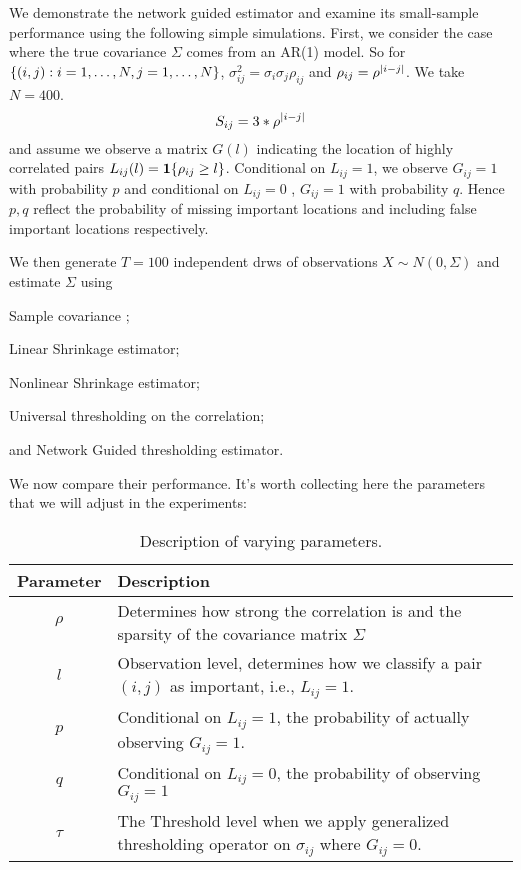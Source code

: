 We demonstrate the network guided estimator and examine its small-sample performance using the following simple simulations. First, we consider the case where the true covariance \(\Sigma\) comes from an AR(1) model. So for \(\Bqty{(i,j): i =1 ,\dots, N, j = 1,\dots,N} \), \(\sigma_{ij}^{2} = \sigma_{i}\sigma_{j} \rho_{ij}\) and \(\rho_{ij} = \rho^{\abs{i - j}}\). We take \(N = 400\). 
\begin{equation*}
     S_{ij} = 3 * \rho^{\abs{i - j}}
\end{equation*}
and assume we observe a matrix \(G(l)\) indicating the location of highly correlated pairs \(L_{ij}(l) = \mathbf{1}\Bqty{\rho_{ij} \geq l}\). Conditional on \(L_{ij} = 1\), we observe \(G_{ij}= 1\) with probability \(p\) and conditional on \(L_{ij}  =0\) , \(G_{ij}  =1\) with probability \(q\). Hence \(p,q\) reflect the probability of missing important locations and including false important locations respectively. 

We then generate \(T = 100\) independent drws of observations \(X \sim N(0, \Sigma)\) and estimate \(\Sigma\) using 
\begin{enumerate*}
     \item Sample covariance ;
     \item Linear Shrinkage estimator;
     \item Nonlinear Shrinkage estimator;
     \item Universal thresholding on the correlation;
     \item and Network Guided thresholding estimator. 
\end{enumerate*}
We now compare their performance. It's worth collecting here the parameters that we will adjust in the experiments:
\begin{table}[htbp]
     \centering\begin{tabularx}{\textwidth}{c|X}
          \toprule
          Parameter & Description \\ 
          \midrule
          \(\rho\) & Determines how strong the correlation is and the sparsity of the covariance matrix \(\Sigma\) \\
          \(l\) & Observation level, determines how we classify a pair \((i,j)\) as important, i.e., \(L_{ij} =1\). \\
          \(p\) & Conditional on \(L_{ij} =1\), the probability of actually observing \(G_{ij} =1\). \\
          \(q\) & Conditional on \(L_{ij} = 0\), the probability of  observing \(G_{ij} =1\)\\
          \(\tau\)& The Threshold level when we apply generalized thresholding operator on \(\sigma_{ij}\) where \(G_{ij} = 0\). \\
          \bottomrule
     \end{tabularx}
     \caption{Description of varying parameters.}
     \label{t:1}
\end{table}

